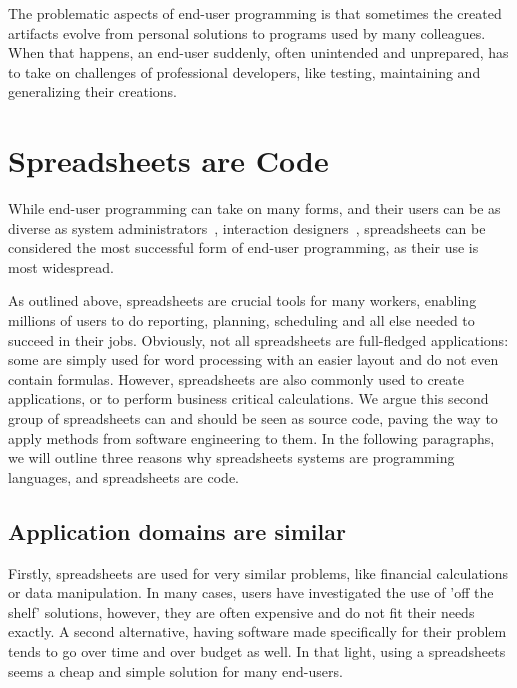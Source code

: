 \documentclass[conference]{IEEEtran}
\begin{document}
The problematic aspects of end-user programming is that sometimes the created artifacts evolve from personal solutions to programs used by many colleagues. When that happens, an end-user suddenly, often unintended and unprepared, has to take on challenges of professional developers, like testing, maintaining and generalizing their creations. 


\section{Spreadsheets are Code}
While end-user programming can take on many forms, and their users can be as diverse as system administrators~\cite{Barrett2004}, interaction designers~\cite{Ko2004, brandt_opportunistic_2008, myers_how_2008}, spreadsheets can be considered the most successful form of end-user programming, as their use is most widespread.

As outlined above, spreadsheets are crucial tools for many workers, enabling millions of users to do reporting, planning, scheduling and all else needed to succeed in their jobs. Obviously, not all spreadsheets are full-fledged applications: some are simply used for word processing with an easier layout and do not even contain formulas. However, spreadsheets are also commonly used to create applications, or to perform business critical calculations. We argue this second group of spreadsheets can and should be seen as source code, paving the way to apply methods from software engineering to them. In the following paragraphs, we will outline three reasons why spreadsheets systems are programming languages, and spreadsheets are code.

\subsection{Application domains are similar}
Firstly, spreadsheets are used for very similar problems, like financial calculations or data manipulation. In many cases, users have investigated the use of 'off the shelf' solutions, however, they are often expensive and do not fit their needs exactly. A second alternative, having software made specifically for their problem tends to go over time and over budget as well. In that light, using a spreadsheets seems a cheap and simple solution for many end-users.
\end{document}
